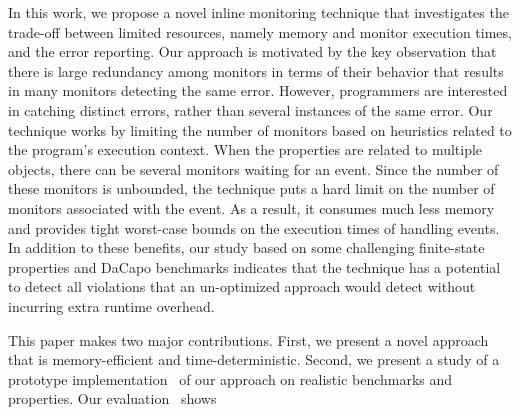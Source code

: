 In this work, we propose a novel inline monitoring technique that investigates 
the trade-off between limited resources, namely memory and monitor execution 
times, and the error reporting. Our approach is motivated by the key 
observation that there is large redundancy among monitors in terms of their 
behavior that results in many monitors detecting the same error. However, 
programmers are interested in catching distinct errors, rather than several 
instances of the same error. Our technique works by limiting the number of 
monitors based on heuristics related to the program's execution context. When 
the properties are related to multiple objects, there can be several monitors 
waiting for an event. Since the number of these monitors is unbounded, the 
technique puts a hard limit on the number of monitors associated with the 
event.  As a result, 
it consumes much less memory and provides tight worst-case bounds on the 
execution times of handling events. In addition to these benefits, our study 
based on some challenging finite-state properties and DaCapo benchmarks 
indicates that the technique has a potential to detect all violations that an 
un-optimized approach would detect without incurring extra runtime overhead.

This paper makes two major contributions.
First, we present a novel approach~ that is memory-efficient 
and time-deterministic. Second, we present a study of a prototype 
implementation~ of our approach on realistic 
benchmarks and properties. Our evaluation~ shows 


